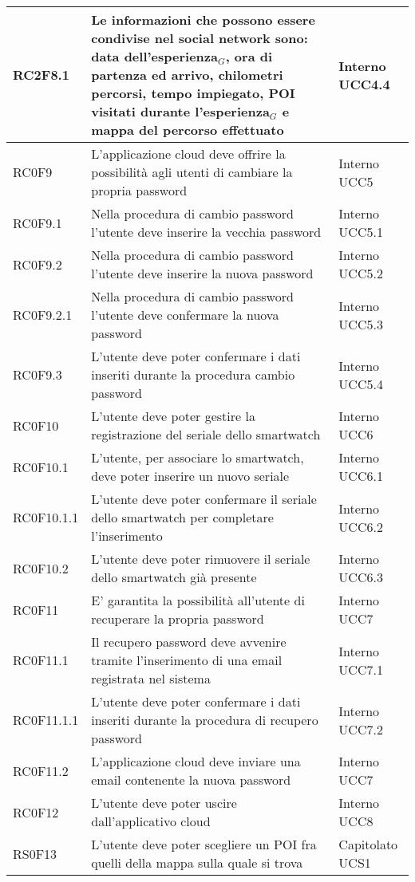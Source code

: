 \begin{center}
\begin{longtable}{|l|p{7cm}|p{1.7cm}|}
RC2F8.1		& Le informazioni che possono essere condivise nel social network sono: data dell'esperienza$_{G}$, ora di partenza ed arrivo, chilometri percorsi, tempo impiegato, POI visitati durante l'esperienza$_{G}$ e mappa del percorso effettuato & Interno UCC4.4 \\\hline
RC0F9		& L'applicazione cloud deve offrire la possibilità agli utenti di cambiare la propria password & Interno UCC5 \\\hline
RC0F9.1		& Nella procedura di cambio password l'utente deve inserire la vecchia password & Interno UCC5.1 \\\hline
RC0F9.2		& Nella procedura di cambio password l'utente deve inserire la nuova password & Interno UCC5.2 \\\hline
RC0F9.2.1	& Nella procedura di cambio password l'utente deve confermare la nuova password & Interno UCC5.3 \\\hline
RC0F9.3		& L'utente deve poter confermare i dati inseriti durante la procedura cambio password & Interno UCC5.4 \\\hline
RC0F10		& L'utente deve poter gestire la registrazione del seriale dello smartwatch & Interno UCC6 \\\hline
RC0F10.1	& L'utente, per associare lo smartwatch, deve poter inserire un nuovo seriale & Interno UCC6.1 \\\hline
RC0F10.1.1	& L'utente deve poter confermare il seriale dello smartwatch per completare l'inserimento & Interno UCC6.2 \\\hline
RC0F10.2	& L'utente deve poter rimuovere il seriale dello smartwatch già presente & Interno UCC6.3 \\\hline
RC0F11		& E' garantita la possibilità all'utente di recuperare la propria password & Interno UCC7 \\\hline
RC0F11.1	& Il recupero password deve avvenire tramite l'inserimento di una email registrata nel sistema & Interno UCC7.1 \\\hline
RC0F11.1.1	& L'utente deve poter confermare i dati inseriti durante la procedura di recupero password & Interno UCC7.2 \\\hline
RC0F11.2	& L'applicazione cloud deve inviare una email contenente la nuova password & Interno UCC7 \\\hline
RC0F12		& L'utente deve poter uscire dall'applicativo cloud & Interno UCC8 \\\hline
RS0F13		& L'utente deve poter scegliere un POI fra quelli della mappa sulla quale si trova & Capitolato UCS1\\\hline

\end{longtable}
\end{center}
